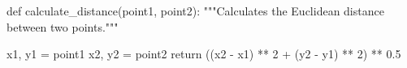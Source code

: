 \startPY
def calculate_distance(point1, point2):
  """Calculates the Euclidean distance between two points."""

  x1, y1 = point1
  x2, y2 = point2
  return ((x2 - x1) ** 2 + (y2 - y1) ** 2) ** 0.5
\stopPY
\stopbuffer

